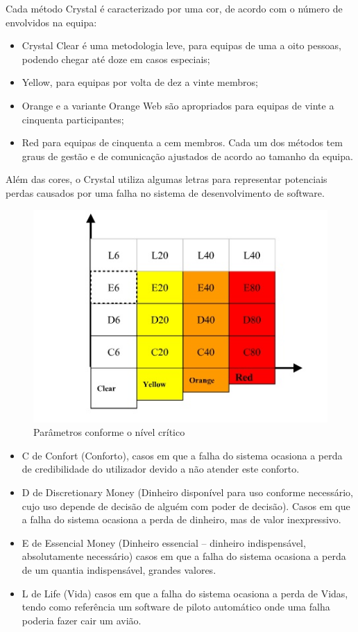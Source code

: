 Cada método Crystal é caracterizado por uma cor, de acordo com o número de envolvidos na equipa:


\begin{itemize}
    \item Crystal Clear é uma metodologia leve, para equipas de uma a oito pessoas, podendo chegar até doze em casos especiais;
    \item Yellow, para equipas por volta de dez a vinte membros;
    \item Orange e a variante Orange Web são apropriados para equipas de vinte a cinquenta participantes;
    \item Red para equipas de cinquenta a cem membros. Cada um dos métodos tem graus de gestão e de comunicação ajustados de acordo ao tamanho da equipa.
\end{itemize}

Além das cores, o Crystal utiliza algumas letras para representar potenciais perdas causados por uma falha no sistema de desenvolvimento de software.

\begin{figure}[H]
    \centering
    \includegraphics[scale=1]{Imagens/img-Crystal.jpg}
    \caption{Parâmetros conforme o nível crítico}
    \label{fig:crystal1}
\end{figure}

\begin{itemize}
    \item C de Confort (Conforto), casos em que a falha do sistema ocasiona a perda de credibilidade do utilizador devido a não atender este conforto.
    \item D de Discretionary Money (Dinheiro disponível para uso conforme necessário, cujo uso depende de decisão de alguém com poder de decisão). Casos em que a falha do sistema ocasiona a perda de dinheiro, mas de valor inexpressivo.
    \item E de Essencial Money (Dinheiro essencial – dinheiro indispensável, absolutamente necessário) casos em que a falha do sistema ocasiona a perda de um quantia indispensável, grandes valores.
    \item L de Life (Vida) casos em que a falha do sistema ocasiona a perda de Vidas, tendo como referência um software de piloto automático onde uma falha poderia fazer cair um avião.
\end{itemize}

